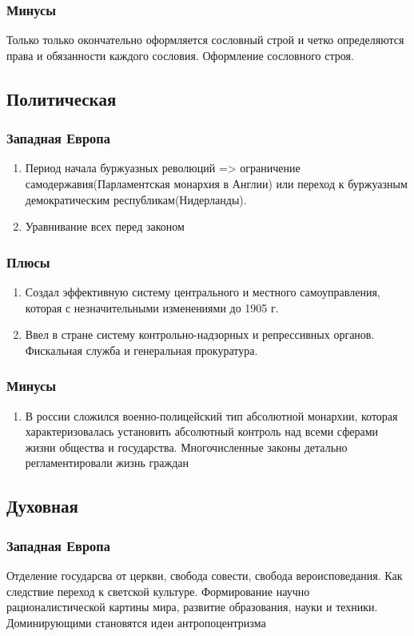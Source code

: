 \documentclass[a4paper]{article}
\begin{document}
\subsubsection{Минусы}
Только только окончательно оформляется сословный строй и четко определяются права и обязанности каждого сословия. Оформление сословного строя.

\subsection{Политическая}
\subsubsection{Западная Европа}
\begin{enumerate}
    \item Период начала буржуазных революций => ограничение самодержавия(Парламентская монархия в Англии) или переход к буржуазным демократическим республикам(Нидерланды).
    \item Уравнивание всех перед законом
\end{enumerate}
\subsubsection{Плюсы}
\begin{enumerate}
    \item Создал эффективную систему центрального и местного самоуправления, которая с незначительными изменениями до 1905 г.
    \item Ввел в стране систему контрольно-надзорных и репрессивных органов. Фискальная служба и генеральная прокуратура.
\end{enumerate}
\subsubsection{Минусы}
\begin{enumerate}
    \item В россии сложился военно-полицейский тип абсолютной монархии, которая характеризовалась установить абсолютный контроль над всеми сферами жизни общества и государства. Многочисленные законы детально регламентировали жизнь граждан
\end{enumerate}

\subsection{Духовная}
\subsubsection{Западная Европа}
Отделение государсва от церкви, свобода совести, свобода вероисповедания. Как следствие переход к светской культуре. Формирование научно рационалистической картины мира, развитие образования,
науки и техники. Доминирующими становятся идеи антропоцентризма
\end{document}
